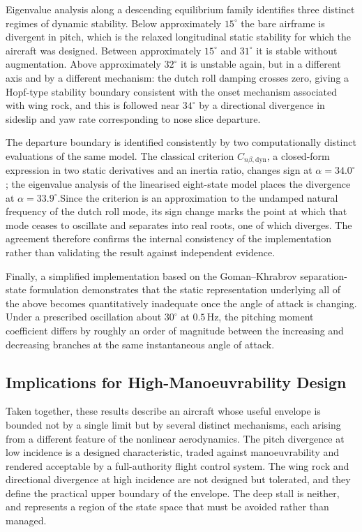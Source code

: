 \documentclass[
bindingoffset=5mm,  %
footnoteindent=3mm, %
hyphenation=true    %
]{src/wut-thesis}
\begin{document}
 Eigenvalue analysis along a descending equilibrium family identifies three
 distinct regimes of dynamic stability. Below approximately $15^{\circ}$ the
 bare airframe is divergent in pitch, which is the relaxed longitudinal static
 stability for which the aircraft was designed. Between approximately
 $15^{\circ}$ and $31^{\circ}$ it is stable without augmentation. Above
 approximately $32^{\circ}$ it is unstable again, but in a different axis and by
 a different mechanism: the dutch roll damping crosses zero, giving a Hopf-type
 stability boundary consistent with the onset mechanism associated with wing
 rock, and this is followed near $34^{\circ}$ by a directional divergence in
 sideslip and yaw rate corresponding to nose slice departure.
 
 The departure boundary is identified consistently by two computationally
 distinct evaluations of the same model. The classical criterion
 $C_{n\beta,\mathrm{dyn}}$, a closed-form expression in two static derivatives
 and an inertia ratio, changes sign at $\alpha = 34.0^{\circ}$; the eigenvalue
 analysis of the linearised eight-state model places the divergence at
 $\alpha = 33.9^{\circ}$.Since the criterion is an approximation to the undamped natural frequency of
 the dutch roll mode, its sign change marks the point at which that mode ceases
 to oscillate and separates into real roots, one of which diverges. The
 agreement therefore confirms the internal consistency of the implementation
 rather than validating the result against independent evidence.
 
 Finally, a simplified implementation based on the Goman--Khrabrov
 separation-state formulation demonstrates that the static representation
 underlying all of the above becomes quantitatively inadequate once the angle of
 attack is changing. Under a prescribed oscillation about $30^{\circ}$ at
 $0.5\,\mathrm{Hz}$, the pitching moment coefficient differs by roughly an order
 of magnitude between the increasing and decreasing branches at the same
 instantaneous angle of attack.
 
 \subsection{Implications for High-Manoeuvrability Design}
 
 Taken together, these results describe an aircraft whose useful envelope is
 bounded not by a single limit but by several distinct mechanisms, each
 arising from a different feature of the nonlinear aerodynamics. The pitch
 divergence at low incidence is a designed characteristic, traded against
 manoeuvrability and rendered acceptable by a full-authority flight control
 system. The wing rock and directional divergence at high incidence are not
 designed but tolerated, and they define the practical upper boundary of the
 envelope. The deep stall is neither, and represents a region of the state
 space that must be avoided rather than managed.
 
\end{document}
